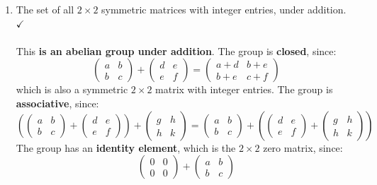\documentclass{article}
\begin{document}
\begin{enumerate}
\begin{enumerate}
            \item The set of all $2 \times 2$ symmetric matrices with integer entries, under addition. $\checkmark$
            \\
            \\ This \textbf{is an abelian group under addition}. The group is \textbf{closed}, since:
            \[
                \begin{pmatrix} a & b \\ b & c \end{pmatrix} + \begin{pmatrix} d & e \\ e & f \end{pmatrix}
                = \begin{pmatrix} a+d & b+e \\ b+e & c+f \end{pmatrix}
            \]
            which is also a symmetric $2 \times 2$ matrix with integer entries. The group is \textbf{associative}, since:
            \[
                \left(\begin{pmatrix} a & b \\ b & c \end{pmatrix} + \begin{pmatrix} d & e \\ e & f \end{pmatrix}\right) + \begin{pmatrix} g & h \\ h & k \end{pmatrix}
                = \begin{pmatrix} a & b \\ b & c \end{pmatrix} + \left(\begin{pmatrix} d & e \\ e & f \end{pmatrix} + \begin{pmatrix} g & h \\ h & k \end{pmatrix}\right)
            \]
            The group has an \textbf{identity element}, which is the $2 \times 2$ zero matrix, since:
            \[
                \begin{pmatrix} 0 & 0 \\ 0 & 0 \end{pmatrix} + \begin{pmatrix} a & b \\ b & c \end{pmatrix}
\]
\end{enumerate}
\end{enumerate}
\end{document}
